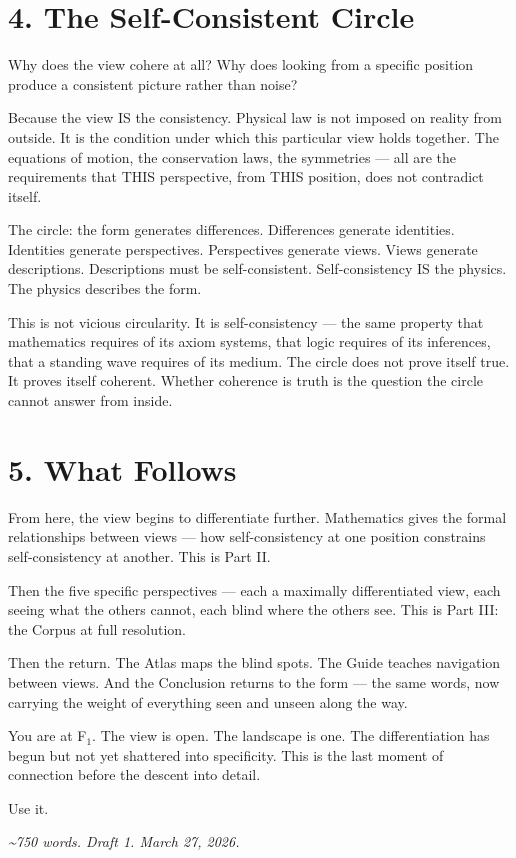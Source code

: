 \section*{4. The Self-Consistent Circle}


Why does the view cohere at all? Why does looking from a specific position produce a consistent picture rather than noise?


Because the view IS the consistency. Physical law is not imposed on reality from outside. It is the condition under which this particular view holds together. The equations of motion, the conservation laws, the symmetries — all are the requirements that THIS perspective, from THIS position, does not contradict itself.


The circle: the form generates differences. Differences generate identities. Identities generate perspectives. Perspectives generate views. Views generate descriptions. Descriptions must be self-consistent. Self-consistency IS the physics. The physics describes the form.


This is not vicious circularity. It is self-consistency — the same property that mathematics requires of its axiom systems, that logic requires of its inferences, that a standing wave requires of its medium. The circle does not prove itself true. It proves itself coherent. Whether coherence is truth is the question the circle cannot answer from inside.


\section*{5. What Follows}


From here, the view begins to differentiate further. Mathematics gives the formal relationships between views — how self-consistency at one position constrains self-consistency at another. This is Part II.


Then the five specific perspectives — each a maximally differentiated view, each seeing what the others cannot, each blind where the others see. This is Part III: the Corpus at full resolution.


Then the return. The Atlas maps the blind spots. The Guide teaches navigation between views. And the Conclusion returns to the form — the same words, now carrying the weight of everything seen and unseen along the way.


You are at F$_1$. The view is open. The landscape is one. The differentiation has begun but not yet shattered into specificity. This is the last moment of connection before the descent into detail.


Use it.


\bigskip\noindent\makebox[\textwidth]{\color{rulegray}\rule{5cm}{0.3pt}}\bigskip


\textit{\textasciitilde{}750 words. Draft 1. March 27, 2026.}

